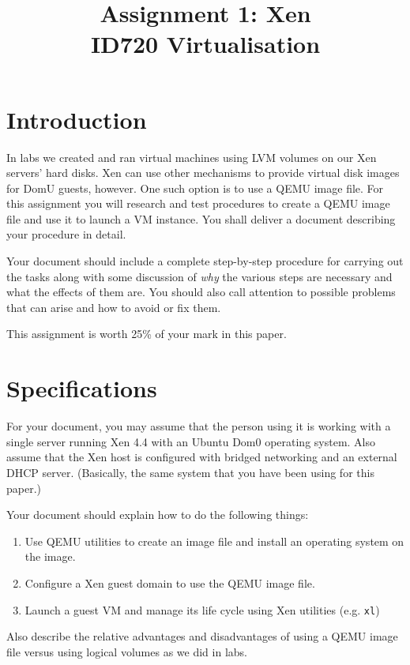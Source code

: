 \documentclass{article}
\begin{document}
\title{Assignment 1: Xen \\ ID720 Virtualisation}
\date{}
\maketitle

\section*{Introduction}
In labs we created and ran virtual machines using LVM volumes on our Xen servers' hard disks. Xen can use other mechanisms to provide virtual disk images for DomU guests, however. One such option is to use a QEMU image file. For this assignment you will research and test procedures to create a QEMU image file and use it to launch a VM instance. You shall deliver a document describing your procedure in detail.

Your document should include a complete step-by-step procedure for carrying out the tasks along with some discussion
of \emph{why} the various steps are necessary and what the effects of them are. You should also call attention to 
possible problems that can arise and how to avoid or fix them.

This assignment is worth 25\% of your mark in this paper.

\section{Specifications}

For your document, you may assume that the person using it is working with a single server running Xen 4.4 with an 
Ubuntu Dom0 operating system. Also assume that the Xen host
is configured with bridged networking and an external DHCP server. (Basically, the same system that you have been using for this paper.)

Your document should explain how to do the following things:

\begin{enumerate}
	\item Use QEMU utilities to create an image file and install an operating system on the image.
	\item Configure a Xen guest domain to use the QEMU image file.
	\item Launch a guest VM and manage its life cycle using Xen utilities (e.g. \texttt{xl})
\end{enumerate}

Also describe the relative advantages and disadvantages of using a QEMU image file versus using logical volumes as we did in labs. 
\end{document}
